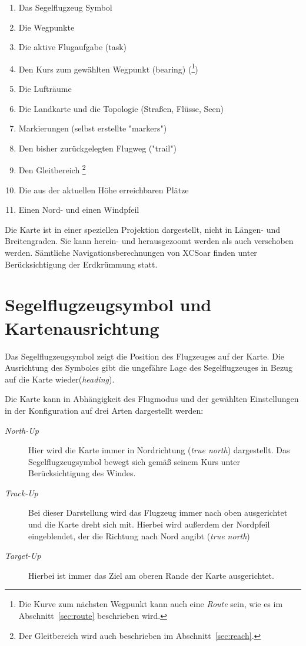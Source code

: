 \begin{enumerate}
  \item Das Segelflugzeug Symbol
  \item Die Wegpunkte
  \item Die aktive Flugaufgabe (task)
  \item Den Kurs zum gewählten Wegpunkt (bearing)
     (\footnote{Die Kurve zum nächsten Wegpunkt kann auch eine {\em Route} sein, wie es im Abschnitt~\ref{sec:route} beschrieben wird.})
    \item Die Lufträume
  \item Die Landkarte und die Topologie (Straßen, Flüsse, Seen)
  \item Markierungen (selbst erstellte "markers")
  \item Den bisher zurückgelegten Flugweg ("trail")
  \item Den Gleitbereich \footnote{Der Gleitbereich wird auch beschrieben im Abschnitt~\ref{sec:reach}.}
  \item Die aus der aktuellen Höhe erreichbaren Plätze
  \item Einen Nord-  und einen Windpfeil
\end{enumerate}

Die Karte ist in einer speziellen Projektion dargestellt, nicht in Längen- und Breitengraden. Sie kann herein- und herausgezoomt werden als auch verschoben werden. Sämtliche Navigationsberechnungen von \textsf{XCSoar} finden unter Berücksichtigung der Erdkrümmung statt.

\section{Segelflugzeugsymbol und Kartenausrichtung}\label{Segelflugzeugsymbol}

Das Segelflugzeugsymbol zeigt die Position des Flugzeuges auf der Karte. Die Ausrichtung des Symboles gibt die ungefähre Lage des Segelflugzeuges in Bezug auf die Karte wieder(\emph{heading}).

Die Karte kann in Abhängigkeit des Flugmodus und der gewählten Einstellungen in der Konfiguration auf drei Arten dargestellt werden:

\begin{description}
\item[\emph{North-Up}] Hier wird die Karte immer in Nordrichtung (\emph{true north}) dargestellt. Das Segelflugzeugsymbol bewegt sich gemäß seinem Kurs unter Berücksichtigung des Windes.
\item[\emph{Track-Up}] Bei dieser Darstellung wird das Flugzeug immer nach oben ausgerichtet und die Karte dreht sich  mit. Hierbei wird außerdem der Nordpfeil eingeblendet, der die Richtung nach Nord angibt (\emph{true north})
\item[\emph{Target-Up}] Hierbei ist immer das Ziel am oberen Rande der Karte ausgerichtet.
\end{description}

